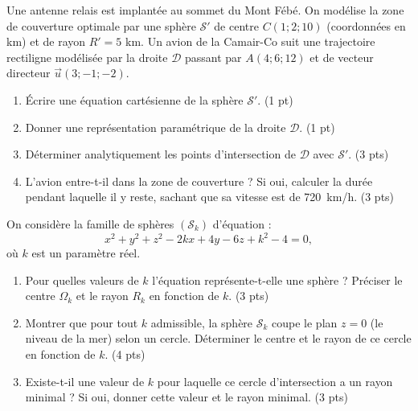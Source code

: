 \documentclass[11pt]{article}
\begin{document}
\begin{exercice}
Une antenne relais est implantée au sommet du Mont Fébé. On modélise la zone de couverture optimale par une sphère $\mathcal{S}'$ de centre $C(1; 2; 10)$ (coordonnées en km) et de rayon $R' = 5$ km. Un avion de la Camair-Co suit une trajectoire rectiligne modélisée par la droite $\mathcal{D}$ passant par $A(4; 6; 12)$ et de vecteur directeur $\vec{u}(3; -1; -2)$.
\begin{enumerate}
    \item Écrire une équation cartésienne de la sphère $\mathcal{S}'$. \hfill (1 pt)
    \item Donner une représentation paramétrique de la droite $\mathcal{D}$. \hfill (1 pt)
    \item Déterminer analytiquement les points d'intersection de $\mathcal{D}$ avec $\mathcal{S}'$. \hfill (3 pts)
    \item L'avion entre-t-il dans la zone de couverture ? Si oui, calculer la durée pendant laquelle il y reste, sachant que sa vitesse est de \SI{720}{km/h}. \hfill (3 pts)
\end{enumerate}
\end{exercice}

\begin{exercice}
On considère la famille de sphères $(\mathcal{S}_k)$ d'équation :
\[
x^2 + y^2 + z^2 - 2kx + 4y - 6z + k^2 - 4 = 0,
\]
où $k$ est un paramètre réel.
\begin{enumerate}
    \item Pour quelles valeurs de $k$ l'équation représente-t-elle une sphère ? Préciser le centre $\Omega_k$ et le rayon $R_k$ en fonction de $k$. \hfill (3 pts)
    \item Montrer que pour tout $k$ admissible, la sphère $\mathcal{S}_k$ coupe le plan $z=0$ (le niveau de la mer) selon un cercle. Déterminer le centre et le rayon de ce cercle en fonction de $k$. \hfill (4 pts)
    \item Existe-t-il une valeur de $k$ pour laquelle ce cercle d'intersection a un rayon minimal ? Si oui, donner cette valeur et le rayon minimal. \hfill (3 pts)
\end{enumerate}
\end{exercice}
\end{document}
